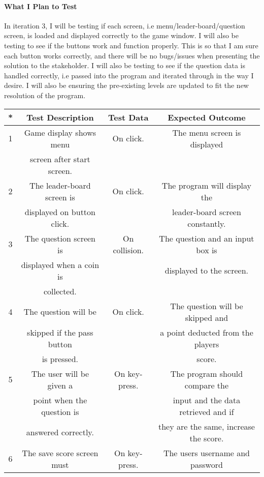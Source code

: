 \documentclass[12pt]{report}
\begin{document}
\paragraph{What I Plan to Test}
In iteration 3, I will be testing if each screen, i.e menu/leader-board/question screen, is loaded and displayed correctly to the game window. I will also be testing to see if the buttons work and function properly. This is so that I am sure each button works correctly, and there will be no bugs/issues when presenting the solution to the stakeholder. I will also be testing to see if the question data is handled correctly, i.e passed into the program and iterated through in the way I desire. I will also be ensuring the pre-existing levels are updated to fit the new resolution of the program. 

\begin{table}[H]
    \centering
    \begin{tabular}{|c|c|c|c|}
    \hline
    \textbf{*} & \textbf{Test Description} & \textbf{Test Data} & \textbf{Expected Outcome}\\
    \hline
    1 & Game display shows menu & On click. & The menu screen is displayed \\
    & screen after start screen. & &\\
    \hline
    2 & The leader-board screen is & On click. & The program will display the\\
      & displayed on button click. & & leader-board screen constantly. \\
    \hline
    3 & The question screen is & On collision. & The question and an input box is\\
    & displayed when a coin is & & displayed to the screen. \\
    & collected. & &\\
    \hline
    4 & The question will be & On click. & The question will be skipped and\\
    & skipped if the pass button & &a point deducted from the players  \\
    & is pressed. & & score.\\
    \hline
    5 & The user will be given a & On key-press. & The program should compare the \\
    & point when the question is & & input and the data retrieved and if\\
    & answered correctly. & & they are the same, increase the score. \\
    \hline
    6 & The save score screen must & On key-press. & The users username and password\\

\end{tabular}
\end{table}
\end{document}
